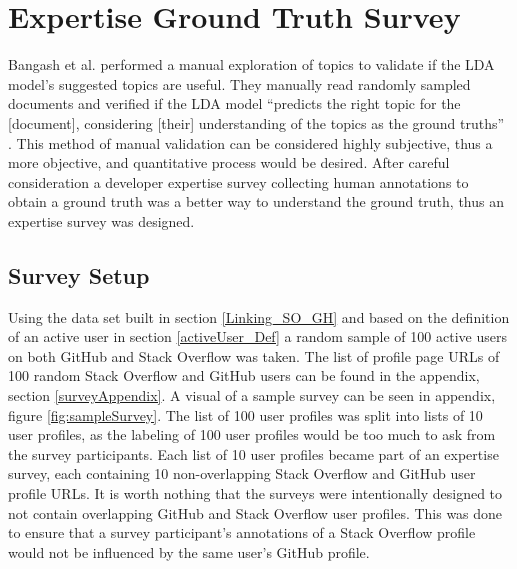     
    \section{Expertise Ground Truth Survey\label{expertiseSurvey}}
    
        Bangash et al. \cite{bangash2019developers} performed a manual exploration of topics to validate if the LDA model's suggested topics are useful. They manually read randomly sampled documents and verified if the LDA model ``predicts the right topic for the [document], considering [their] understanding of the topics as the ground truths'' \cite{bangash2019developers}. This method of manual validation can be considered highly subjective, thus a more objective, and quantitative process would be desired. After careful consideration a developer expertise survey collecting human annotations to obtain a ground truth was a better way to understand the ground truth, thus an expertise survey was designed. 
    
        \subsection{Survey Setup}
        
            Using the data set built in section \ref{Linking_SO_GH} and based on the definition of an active user in section \ref{activeUser_Def} a random sample of 100 active users on both GitHub and Stack Overflow was taken. The list of profile page URLs of 100 random Stack Overflow and GitHub users can be found in the appendix, section \ref{surveyAppendix}. A visual of a sample survey can be seen in appendix, figure \ref{fig:sampleSurvey}. The list of 100 user profiles was split into lists of 10 user profiles, as the labeling of 100 user profiles would be too much to ask from the survey participants. Each list of 10 user profiles became part of an expertise survey, each containing 10 non-overlapping Stack Overflow and GitHub user profile URLs. It is worth nothing that the surveys were intentionally designed to not contain overlapping GitHub and Stack Overflow user profiles. This was done to ensure that a survey participant's annotations of a Stack Overflow profile would not be influenced by the same user's GitHub profile.
            

